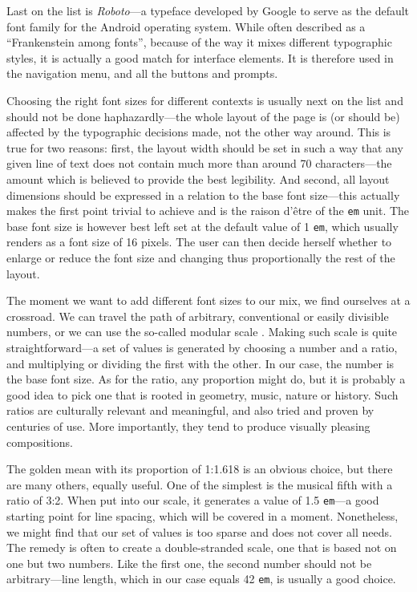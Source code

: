 \documentclass[thesis=M,english,hidelinks]{FITthesis}[2012/10/20]
\newcommand{\code}{\texttt}
\begin{document}
Last on the list is \textit{Roboto}---a typeface developed by Google to serve as the default font family for the Android operating system. While often described as a ``Frankenstein among fonts'', because of the way it mixes different typographic styles, it is actually a good match for interface elements. It is therefore used in the navigation menu, and all the buttons and prompts.

Choosing the right font sizes for different contexts is usually next on the list and should not be done haphazardly---the whole layout of the page is (or should be) affected by the typographic decisions made, not the other way around. This is true for two reasons: first, the layout width should be set in such a way that any given line of text does not contain much more than around 70 characters---the amount which is believed to provide the best legibility. And second, all layout dimensions should be expressed in a relation to the base font size---this actually makes the first point trivial to achieve and is the raison d'être of the \code{em} unit. The base font size is however best left set at the default value of 1 \code{em}, which usually renders as a font size of 16 pixels. The user can then decide herself whether to enlarge or reduce the font size and changing thus proportionally the rest of the layout.

The moment we want to add different font sizes to our mix, we find ourselves at a crossroad. We can travel the path of arbitrary, conventional or easily divisible numbers, or we can use the so-called modular scale \cite{brown}. Making such scale is quite straightforward---a set of values is generated by choosing a number and a ratio, and multiplying or dividing the first with the other. In our case, the number is the base font size. As for the ratio, any proportion might do, but it is probably a good idea to pick one that is rooted in geometry, music, nature or history. Such ratios are culturally relevant and meaningful, and also tried and proven by centuries of use. More importantly, they tend to produce visually pleasing compositions.

The golden mean with its proportion of 1:1.618 is an obvious choice, but there are many others, equally useful. One of the simplest is the musical fifth with a ratio of 3:2. When put into our scale, it generates a value of 1.5 \code{em}---a good starting point for line spacing, which will be covered in a moment. Nonetheless, we might find that our set of values is too sparse and does not cover all needs. The remedy is often to create a double-stranded scale, one that is based not on one but two numbers. Like the first one, the second number should not be arbitrary---line length, which in our case equals 42 \code{em}, is usually a good choice.
\end{document}
